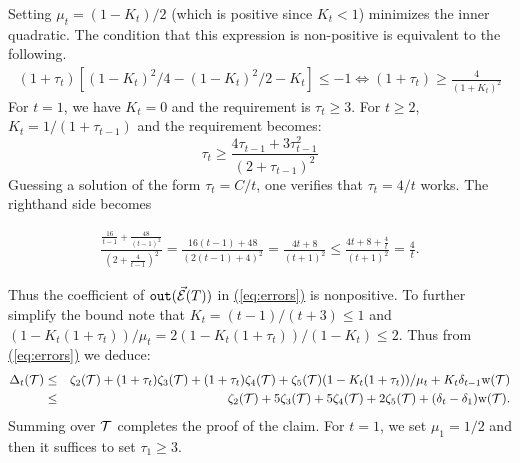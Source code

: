 \documentclass{acmsmall}
\newcommand{\cE}{{\cal E}}
\newcommand{\cT}{{\cal T}}
\newcommand{\Eqn}[1]{\hyperref[eq:#1]{(\ref*{eq:#1})}} %
\newcommand{\outside}{{\tt out}}
\newcommand{\width}{{\bf {\rm  w}}}
\newcommand{\errorterm}{\zeta}
\begin{document}
%
Setting $\mu_t = (1-K_t)/2$ (which is positive since $K_t < 1$) minimizes the inner quadratic. The condition that this expression
is non-positive is equivalent to the following.
%
\begin{align*}
(1+\tau_t)[(1-K_t)^2/4 - (1-K_t)^2/2 - K_t] \leq -1 
\Longleftrightarrow (1+\tau_t) \geq \frac{4}{(1+K_t)^2}
\end{align*}
%
%
%
%
%
%
For $t=1$, we have $K_t=0$ and the requirement is $\tau_t \geq 3$.  For $t \geq 2$,
$K_t=1/(1+\tau_{t-1})$ and the requirement becomes:
\[
\tau_t \geq \frac{4\tau_{t-1} + 3\tau^2_{t-1}}{(2+\tau_{t-1})^2}
\]
Guessing a solution of the form $\tau_t = C/t$, one verifies that $\tau_t=4/t$ works.  The
righthand side becomes

\begin{eqnarray*}
\frac{\frac{16}{t-1}+\frac{48}{(t-1)^2}}{(2+\frac{4}{t-1})^2} = \frac{16(t-1)+48}{(2(t-1)+4)^2} = \frac{4t+8}{(t+1)^2} \leq \frac{4t+8+\frac{4}{t}}{(t+1)^2} = \frac{4}{t}. 
\end{eqnarray*}

%

Thus the coefficient of $\outside(\vec{\cE}(T))$ in \Eqn{errors} is nonpositive.  To further simplify the bound
note that $K_t = (t-1)/(t+3) \leq 1$	and  $(1-K_t(1+\tau_t))/\mu_t  =2 (1-K_t(1+\tau_t))/(1-K_t) \leq 2$.
Thus from \Eqn{errors} we deduce: 
%
\begin{eqnarray*}
\Delta_t(\cT)
 &\leq & \errorterm_2(\cT)+(1+\tau_t)\errorterm_3(\cT)+(1+\tau_t)\errorterm_4(\cT)+ \errorterm_5(\cT)(1-K_t(1+\tau_t))/\mu_t+ K_t\delta_{t-1} \width(\cT) \\
 &\leq & \errorterm_2(\cT)+ 5\errorterm_3(\cT)+ 5 \errorterm_4(\cT)+ 2\errorterm_5(\cT)+ (\delta_{t}-\delta_1) \width(\cT).
\end{eqnarray*}
Summing over $\cT$ completes the proof of the claim.
\smallskip
\iffalse
For $t=1$, we set $\mu_1=1/2$ and then it suffices to set $\tau_1 \geq 3$.
\end{document}
